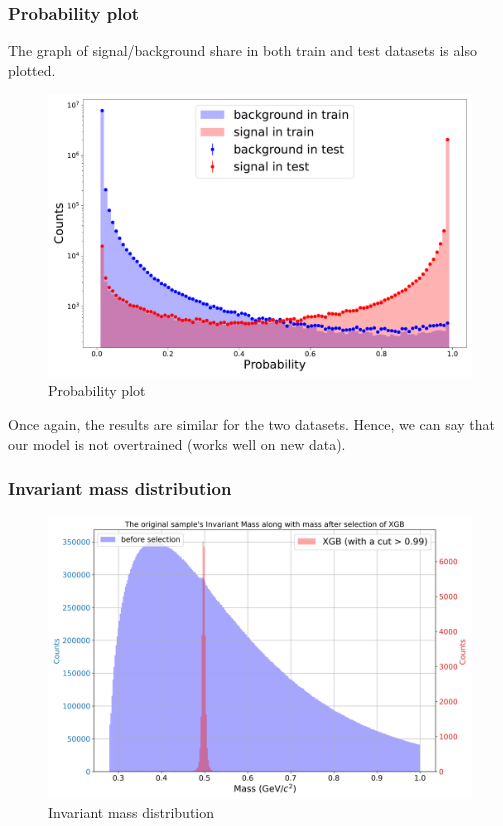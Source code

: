 \documentclass[12pt,a4paper]{report}
\begin{document}
\subsubsection{Probability plot}
The graph of signal/background share in both train and test datasets is also plotted.
\begin{figure}[H]
    \centering
    \includegraphics[width=.8\textwidth]{images/probability.pdf}
    \caption{Probability plot}
\end{figure}

Once again, the results are similar for the two datasets. Hence, we can say that our model is not overtrained (works well on new data).

\subsubsection{Invariant mass distribution}
\begin{figure}[H]
    \centering
    \includegraphics[width=.9\textwidth]{images/cut_visualization.png}
    \caption{Invariant mass distribution}
\end{figure}
\end{document}
